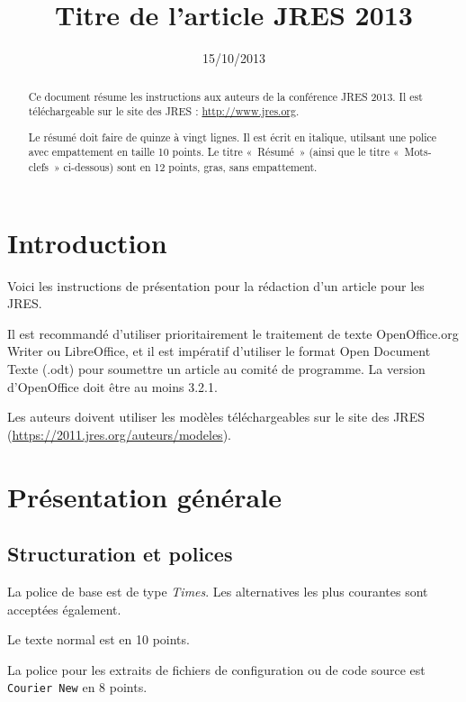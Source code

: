 \documentclass[11pt]{jres}
\title{Titre de l'article JRES 2013}
\date{15/10/2013}
\begin{document}
\maketitle

\begin{abstract}
Ce document résume les instructions aux auteurs de la conférence JRES 2013.
Il est téléchargeable sur le site des JRES : \url{http://www.jres.org}.

Le résumé doit faire de quinze à vingt lignes. Il est écrit en italique,
utilsant une police avec empattement en taille  10 points. 
Le titre « Résumé » (ainsi que le titre «~Mots-clefs~» ci-dessous) 
sont en 12 points, gras, sans empattement.
\end{abstract}


\section{Introduction}

Voici les instructions de présentation pour la rédaction d'un article
pour les JRES.  


Il est recommandé d'utiliser prioritairement le
traitement de texte OpenOffice.org Writer ou LibreOffice, et il est
impératif d'utiliser le format Open Document Texte (.odt) pour
soumettre un article au comité de programme. 
La version d'OpenOffice doit être au moins 3.2.1.  

Les auteurs doivent utiliser les modèles téléchargeables sur le site
des JRES (\url{https://2011.jres.org/auteurs/modeles}).

\section{Présentation générale}

\subsection{Structuration et polices}

La police de base est de type \emph{Times}. Les alternatives les plus
courantes sont acceptées également.

Le texte  normal est en 10 points.

La police pour les extraits de fichiers de configuration ou de code source est \texttt{Courier New} en 8 points.
\end{document}
